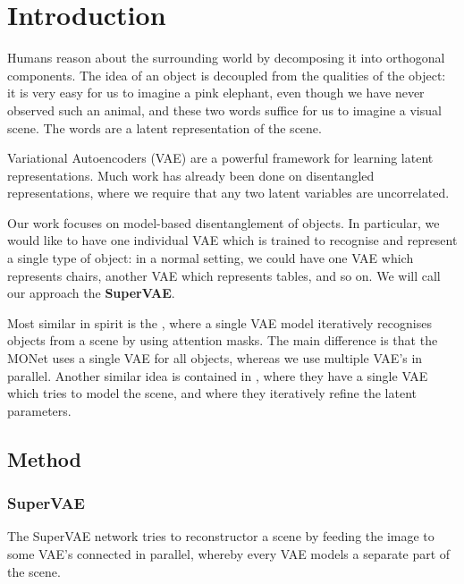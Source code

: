 \newcommand{\package}{\emph}

\chapter{Introduction}

Humans reason about the surrounding world by decomposing it into orthogonal components.
The idea of an object is decoupled from the qualities of the object: it is very
easy for us to imagine a pink elephant, even though we have never observed such
an animal, and these two words suffice for us to imagine a visual scene.
The words are a latent representation of the scene.

Variational Autoencoders (VAE) \cite{bib:vae_paper} are a powerful framework for
learning latent representations. Much work has already been done on disentangled
representations, where we require that any two latent variables are uncorrelated.

Our work focuses on model-based disentanglement of objects. In particular, we
would like to have one individual VAE which is trained to recognise and
represent a single type of object: in a normal setting, we could have one VAE
which represents chairs, another VAE which represents tables, and so on.
We will call our approach the \textbf{SuperVAE}.

Most similar in spirit is the \cite{bib:monet}, where a single VAE model
iteratively recognises objects from a scene by using attention masks.
The main difference is that the MONet uses a single VAE for all objects, whereas
we use multiple VAE's in parallel.
Another similar idea is contained in \cite{bib:iodine}, where they have a single
VAE which tries to model the scene, and where they iteratively refine the latent
parameters.

\section{Method}

\subsection{SuperVAE}


The SuperVAE network tries to reconstructor a scene by feeding the image to some
VAE's connected in parallel, whereby every VAE models a separate part of the scene.


